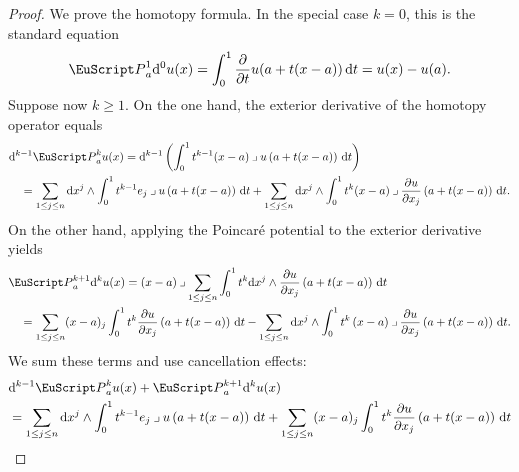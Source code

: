 \documentclass[10pt,a4paper]{amsart}
\theoremstyle{definition}
\theoremstyle{remark}
\numberwithin{equation}{section}
\newcommand{\euP}{{\EuScript P}}
\newcommand{\dif}{{\mathrm d}}
\newcommand{\contract}{\mathbin{\lrcorner}}
\newcommand{\cartan}{{\mathrm d}}
\newcommand{\cartanx}{{\mathrm d}x}
\newcommand{\Poincare}{\euP}
\begin{document}
\begin{proof}
    We prove the homotopy formula. 
    In the special case $k = 0$, this is the standard equation 
    \begin{align*}
        \Poincare^{1}_{a} \cartan^{0} u(x)
        = 
        \int_{0}^{1} \frac{\partial}{\partial t} u( a + t ( x - a ) ) \,\dif t
        =
        u(x) - u(a)
        .
    \end{align*}
    Suppose now $k \geq 1$. 
    On the one hand, the exterior derivative of the homotopy operator equals 
    \begin{align*}
        &
        \cartan^{k-1} \Poincare^{k}_{a} u(x)
        =
        \cartan^{k-1}\left( \int_{0}^{1} t^{k-1} (x-a)\contract u\left(a+t(x-a)\right)\,\dif t \right)
        \\&\quad 
        =
        \sum_{1 \leq j \leq n}
        \cartanx^{j} \wedge 
        \int_{0}^{1}
        t^{k-1} e_{j} \contract u\left(a+t(x-a)\right) \,\dif t
+
        \sum_{1 \leq j \leq n}
        \cartanx^{j} \wedge 
        \int_{0}^{1}
        t^{k} 
        (x-a) \contract         
        \frac{ \partial u }{\partial x_{j}}\left(a+t(x-a)\right) 
        \,\dif t
        .
    \end{align*}
    On the other hand, 
    applying the Poincar\'e potential to the exterior derivative yields
    \begin{align*}
        &
        \Poincare^{k+1}_{a} \cartan^{k} u(x)
        =
        (x-a)\contract
        \sum_{1 \leq j \leq n}
        \int_{0}^{1} t^{k} 
        \cartanx^{j} \wedge \frac{ \partial u }{\partial x_{j}}\left(a+t(x-a)\right) \,\dif t
        \\&\quad 
        =
        \sum_{1 \leq j \leq n}
        (x-a)_{j}
        \int_{0}^{1} t^{k} \frac{ \partial u }{\partial x_{j}}\left(a+t(x-a)\right) \,\dif t
-
        \sum_{1 \leq j \leq n}
        \cartanx^{j} \wedge
        \int_{0}^{1} t^{k} \,(x-a) \contract
        \frac{ \partial u }{\partial x_{j}}\left(a+t(x-a)\right) \,\dif t
        .
    \end{align*}
    We sum these terms and use cancellation effects:
    \begin{align*}
        &
        \cartan^{k-1} \Poincare^{k}_{a} u(x)
        +
        \Poincare^{k+1}_{a} \cartan^{k} u(x)
        \\&
        =
        \sum_{1 \leq j \leq n}
        \cartanx^{j} \wedge 
        \int_{0}^{1}
        t^{k-1} e_{j} \contract u\left(a+t(x-a)\right) \,\dif t
        +
        \sum_{1 \leq j \leq n}
        (x-a)_{j}
        \int_{0}^{1} t^{k} \frac{ \partial u }{\partial x_{j}}\left(a+t(x-a)\right) \,\dif t

\end{align*}
\end{proof}
\end{document}
